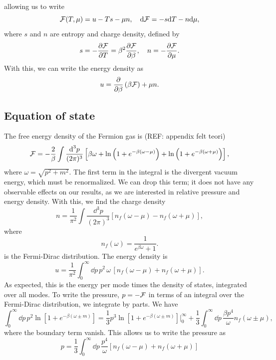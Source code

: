%
allowing us to write
%
\begin{equation}
    \mathcal{F}(T, \mu) = u - Ts - \mu n, \quad
    \text{d} \mathcal{F} = -s \text{d} T - n \text{d} \mu,
\end{equation}
% 
where $s$ and $n$ are entropy and charge density, defined by
%
\begin{equation}
    s = - \diffp{\Eff}{T} = \beta^2 \diffp{\Eff}{\beta}, \quad
    n = - \diffp{\Eff}{\mu}.
\end{equation}
%
With this, we can write the energy density as
%
\begin{equation}
    u = \diffp{}{\beta} \left(\beta \Eff\right) + \mu n.
\end{equation}


\subsection{Equation of state}
The free energy density of the Fermion gas is (REF: appendix felt teori)
%
\begin{equation}
    \mathcal{F} = - 
    \frac{2}{\beta}\int \frac{\text{d}^3 p}{(2 \pi)^3} 
    \left[
        \beta \omega
        +
        \ln\left(1 + e^{-\beta(\omega - \mu)}\right)
        + 
        \ln\left(1 + e^{-\beta(\omega + \mu)}\right)
    \right],
\end{equation}
%
where $\omega = \sqrt{p^2 + m^2}$.
The first term in the integral is the divergent vacuum energy, which must be renormalized.
We can drop this term; it does not have any observable effects on our results, as we are interested in relative pressure and energy density.
With this, we find the charge density
%
\begin{equation}
    n = \frac{1}{\pi^2} \int \frac{\dd^3 p}{(2 \pi)^3} [n_f(\omega - \mu) - n_f(\omega + \mu)],
\end{equation}
%
where
%
\begin{equation}
    n_f(\omega) = \frac{1}{e^{\beta \omega} + 1}.
\end{equation}
%
is the Fermi-Dirac distribution.
The energy density is 
%
\begin{equation}
    \label{energy density}
    u = \frac{1}{\pi^2} \int_0^\infty \dd p\, p^2 \, \omega \, [n_f(\omega - \mu) + n_f(\omega + \mu)].
\end{equation}
%
As expected, this is the energy per mode times the density of states, integrated over all modes.
To write the pressure, $p = - \mathcal{F}$ in terms of an integral over the Fermi-Dirac distribution, we integrate by parts.
We have
%
\begin{equation}
    \int_0^\infty \dd p \, p^2 \ln\left[1 + e^{-\beta(\omega \pm m)}\right]
    = 
    \frac{1}{3} p^3\ln\left[1 + e^{-\beta(\omega \pm m)}\right] \bigg |_0^\infty
    + 
    \frac{1}{3} \int_0^\infty \dd p \, \frac{ \beta p^4}{\omega}n_f(\omega \pm \mu),
\end{equation}
%
where the boundary term vanish.
This allows us to write the pressure as 
%
\begin{equation}
    \label{pressure}
    p = \frac{1}{3} \int_0^\infty \dd p \, \frac{p^4}{\omega} [n_f(\omega - \mu) + n_f(\omega + \mu)]
\end{equation}



